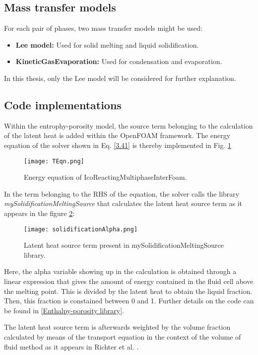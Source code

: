 \subsection{Mass transfer models}
For each pair of phases, two mass transfer models might be used:
\begin{itemize}
	\item \textbf{Lee model:} Used for solid melting and liquid solidification.
	\item \textbf{KineticGasEvaporation:} Used for condensation and evaporation.
\end{itemize}
In this thesis, only the Lee model will be considered for further explanation.


\subsection{Code implementations}

\setlength{\parindent}{0.5cm} Within the entrophy-porosity model, the source term belonging to the calculation of the latent heat is added within the OpenFOAM framework. The energy equation of the solver shown in Eq. \ref{3.41} is thereby implemented in Fig. \ref{3.8fig}
\begin{figure}[h!]
	\centering
	\texttt{[image: TEqn.png]}\hfill	
	\caption{Energy equation of IcoReactingMultiphaseInterFoam.}
	\label{3.8fig}
\end{figure}
In the term belonging to the RHS of the equation, the solver calls the library \textit{mySolidificationMeltingSource} that calculates the latent heat source term as it appears in the figure \ref{3.9fig}:
\begin{figure}[h!]
	\centering
	\texttt{[image: solidificationAlpha.png]}\hfill	
	\caption{Latent heat source term present in mySolidificationMeltingSource library.}
	\label{3.9fig}
\end{figure}
Here, the alpha variable showing up in the calculation is obtained through a linear expression that gives the amount of energy contained in the fluid cell above the melting point. This is divided by the latent heat to obtain the liquid fraction. Then, this fraction is constained between 0 and 1. Further details on the code can be found in \ref{Enthalpy-porosity library}.

The latent heat source term is afterwards weighted by the volume fraction calculated by means of the transport equation in the context of the volume of fluid method as it appears in Richter et al. \cite{richter_turnow_kornev_hassel_2016}.

